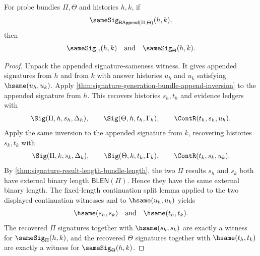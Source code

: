 \begin{theorem}
\label{thm:samesig-bundle-append-exact-split}
For probe bundles $\Pi,\Theta$ and histories $h,k$, if
$$
\sameSig_{\mathsf{BAppend}(\Pi,\Theta)}(h,k),
$$
then
$$
\sameSig_\Pi(h,k)
\quad\text{and}\quad
\sameSig_\Theta(h,k).
$$
\end{theorem}
\begin{proof}
Unpack the appended signature-sameness witness. It gives appended signatures
from $h$ and from $k$ with answer histories $u_h$ and $u_k$ satisfying
$\hsame(u_h,u_k)$. Apply
\autoref{thm:signature-generation-bundle-append-inversion} to the appended
signature from $h$. This recovers histories $s_h,t_h$ and evidence ledgers with
$$
\Sig(\Pi,h,s_h,\Delta_h),
\qquad
\Sig(\Theta,h,t_h,\Gamma_h),
\qquad
\ContR(t_h,s_h,u_h).
$$
Apply the same inversion to the appended signature from $k$, recovering
histories $s_k,t_k$ with
$$
\Sig(\Pi,k,s_k,\Delta_k),
\qquad
\Sig(\Theta,k,t_k,\Gamma_k),
\qquad
\ContR(t_k,s_k,u_k).
$$
By \autoref{thm:signature-result-length-bundle-length}, the two $\Pi$ results
$s_h$ and $s_k$ both have external binary length $\mathsf{BLEN}(\Pi)$. Hence
they have the same external binary length. The fixed-length continuation split
lemma applied to the two displayed continuation witnesses and to
$\hsame(u_h,u_k)$ yields
$$
\hsame(s_h,s_k)
\quad\text{and}\quad
\hsame(t_h,t_k).
$$
The recovered $\Pi$ signatures together with $\hsame(s_h,s_k)$ are exactly a
witness for $\sameSig_\Pi(h,k)$, and the recovered $\Theta$ signatures together
with $\hsame(t_h,t_k)$ are exactly a witness for $\sameSig_\Theta(h,k)$.
\end{proof}

